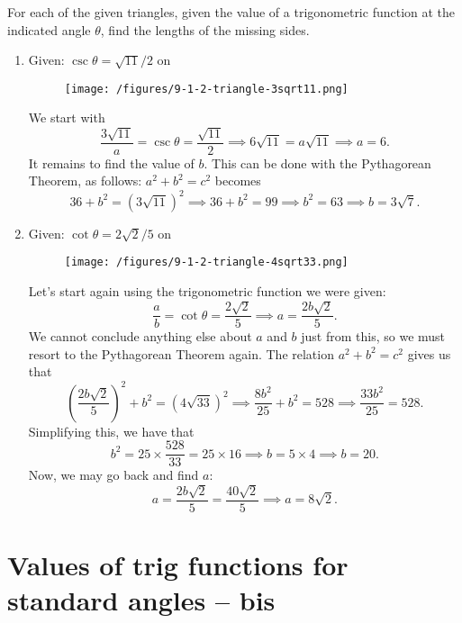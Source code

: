 \documentclass{ximera}
\begin{document}
\begin{example}
  For each of the given triangles, given the value of a trigonometric function at the indicated angle $\theta$, find the lengths of the missing sides.
  \begin{enumerate}[label=\alph*.]
  \item Given: $\csc\theta = \sqrt{11}/2$ on
    \begin{figure}[h]
      \centering
      \texttt{[image: /figures/9-1-2-triangle-3sqrt11.png]}
    \end{figure}
    
    \begin{explanation}
      We start with $$\frac{3\sqrt{11}}{a} = \csc\theta = \frac{\sqrt{11}}{2} \implies 6\sqrt{11} = a\sqrt{11} \implies a = 6.$$It remains to find the value of $b$. This can be done with the Pythagorean Theorem, as follows: $a^2+b^2=c^2$ becomes  $$36 + b^2 = (3\sqrt{11})^2 \implies 36+b^2 = 99 \implies b^2= 63 \implies b = 3\sqrt{7}.$$
    \end{explanation}
  \item Given: $\cot\theta = 2\sqrt{2}/5$ on     \begin{figure}[h]
      \centering
      \texttt{[image: /figures/9-1-2-triangle-4sqrt33.png]}
    \end{figure}

    
    \begin{explanation}
      Let's start again using the trigonometric function we were given: $$\frac{a}{b} = \cot\theta = \frac{2\sqrt{2}}{5} \implies a= \frac{2b\sqrt{2}}{5}.$$We cannot conclude anything else about $a$ and $b$ just from this, so we must resort to the Pythagorean Theorem again. The relation $a^2+b^2=c^2$ gives us that $$\left(\frac{2b\sqrt{2}}{5}\right)^2+b^2 = (4\sqrt{33})^2 \implies \frac{8b^2}{25}+b^2 = 528 \implies \frac{33b^2}{25} = 528.$$Simplifying this, we have that $$b^2 = 25\times \frac{528}{33} = 25\times 16 \implies b = 5\times 4 \implies b=20.$$Now, we may go back and find $a$: $$a = \frac{2b\sqrt{2}}{5}= \frac{40\sqrt{2}}{5} \implies a = 8\sqrt{2}.$$
    \end{explanation}
  \end{enumerate}
\end{example}


\section{Values of trig functions for standard angles -- bis}
\end{document}
